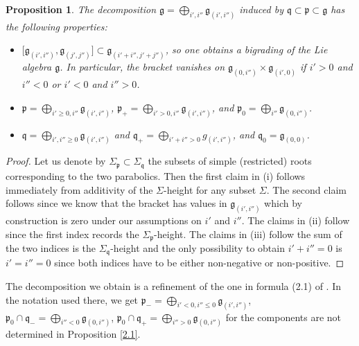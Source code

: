 \documentclass[10pt,a4paper]{amsart}
\numberwithin{equation}{section}
\newtheorem{Proposition}[Theorem]{Proposition}
 { \theoremstyle{definition}
\newtheorem{Definition}[Theorem]{Definition}
\newtheorem{Example}[Theorem]{Example}
\newtheorem{Remark}[Theorem]{Remark} }
\def\frak{\mathfrak}
\newcommand{\x}{\times}
\newcommand{\Si}{\Sigma}
\begin{document}
\begin{Proposition}\label{prop2.1}\samepage
The decomposition $\frak g=\bigoplus_{i',i''}\frak g_{(i',i'')}$ induced by $\frak
q\subset\frak p\subset\frak g$ has the following properties:
\begin{itemize}\itemsep=0pt
\item[$(i)$] $\bigl[\frak g_{(i',i'')},\frak g_{(j',j'')}\bigr]\subset \frak g_{(i'+i'',j'+j'')}$, so one
obtains a bigrading of the Lie algebra $\frak g$. In particular, the bracket vanishes
on $\frak g_{(0,i'')}\x \frak g_{(i',0)}$ if $i'>0$ and $i''<0$ or $i'<0$ and $i''>0$.

\item[$(ii)$] $\frak p=\bigoplus_{i'\geq 0,i''}\frak g_{(i',i'')}$, $\frak
p_+=\bigoplus_{i'>0,i''}\frak g_{(i',i'')}$, and $\frak p_0=\bigoplus_{i''}\frak g_{(0,i'')}$.

\item[$(iii)$] $\frak q=\bigoplus_{i',i''\geq 0}\frak g_{(i',i'')}$ and
$\frak q_+=\bigoplus_{i'+i''>0} g_{(i',i'')}$, and $\frak q_0=\frak g_{(0,0)}$.
\end{itemize}
\end{Proposition}
\begin{proof}
 Let us denote by $\Si_{\frak p}\subset\Si_{\frak q}$ the subsets of simple
 (restricted) roots corresponding to the two parabolics. Then the first claim in (i)
 follows immediately from additivity of the $\Si$-height for any subset $\Si$. The
 second claim follows since we know that the bracket has values in
 $\frak g_{(i',i'')}$ which by construction is zero under our assumptions on $i'$ and
 $i''$. The claims in (ii) follow since the first index records the
 $\Si_{\frak p}$-height. The claims in (iii) follow the sum of the two indices
 is the $\Si_{\frak q}$-height and the only possibility to obtain $i'+i''=0$ is
 $i'=i''=0$ since both indices have to be either non-negative or non-positive.
\end{proof}

The decomposition we obtain is a refinement of the one in formula (2.1) of \cite{Rel-BGG1}.
In the notation used there, we get
$\frak p_-=\bigoplus_{i'<0,i''\leq 0}\frak g_{(i',i'')}$,
$\frak p_0\cap\frak q_-=\bigoplus_{i''<0}\frak g_{(0,i'')}$,
$\frak p_0\cap\frak q_+=\bigoplus_{i''>0}\frak g_{(0,i'')}$ for the components are not
determined in Proposition \ref{2.1}.
\end{document}
